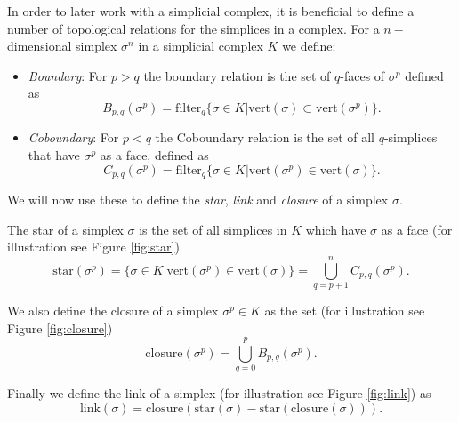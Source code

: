 In order to later work with a simplicial complex, it is beneficial to
define a number of topological relations for the simplices in a complex. For a
$n-$dimensional simplex $\sigma^n$ in a simplicial complex $K$ we define:
\begin{itemize}
    \item \textit{Boundary}: For $p > q$ the boundary relation is the set of
         $q$-faces of $\sigma^p$ defined as
         \[
            B_ {p,q}(\sigma^p) = \text{filter}_q\{\sigma \in K | \text{vert}(\sigma) \subset \text{vert}(\sigma^p)\}.
         \]

    \item \textit{Coboundary}: For $p < q$ the Coboundary relation is the set of
         all $q$-simplices that have $\sigma^p$ as a face, defined as
         \[
            C_ {p,q}(\sigma^p) = \text{filter}_q \{\sigma \in K | \text{vert}(\sigma^p) \in \text{vert}(\sigma)\}.
         \]
\end{itemize}

We will now use these to define the \emph{star}, \emph{link} and \emph{closure}
of a simplex $\sigma$.

The star of a simplex $\sigma$ is the set of all simplices in $K$ which have
$\sigma$ as a face (for illustration see Figure \ref{fig:star})
\[
  \text{star}(\sigma^p) = \{ \sigma \in K | \text{vert}(\sigma^p) \in \text{vert}(\sigma) \} = \bigcup_{q=p+1}^{n}C_{p,q}(\sigma^p).
\]

We also define the closure of a simplex $\sigma^p \in K$ as the set (for
illustration see Figure \ref{fig:closure})
\[
  \text{closure}(\sigma^p) = \bigcup_{q=0}^{p}B_ {p,q}(\sigma^p).
\]

Finally we define the link of a simplex (for illustration see Figure \ref{fig:link}) as
\[
  \text{link}(\sigma) = \text{closure}(\text{star}(\sigma)-\text{star}(\text{closure}(\sigma))).
\]

